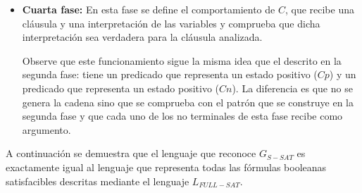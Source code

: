 \begin{itemize}
    \item \textbf{Cuarta fase:} En esta fase se define el comportamiento de $C$, que recibe una cláusula y una
          interpretación de las variables y comprueba que dicha interpretación sea verdadera para la cláusula analizada.
          \begin{enumerate}[start=23]
          \end{enumerate}
          
          Observe que este funcionamiento sigue la misma idea que el descrito en la segunda fase: tiene un predicado que representa un estado positivo ($Cp$) y un predicado que representa un estado positivo ($Cn$). La diferencia es que no se genera la cadena sino que se comprueba con el patrón que se construye en la segunda fase y que cada uno de los no terminales de esta fase recibe como argumento.        
\end{itemize}

A continuación se demuestra que el lenguaje que reconoce $G_{S-SAT}$ es exactamente igual al lenguaje que representa todas las fórmulas booleanas satisfacibles descritas mediante el lenguaje $L_{FULL-SAT}$.

